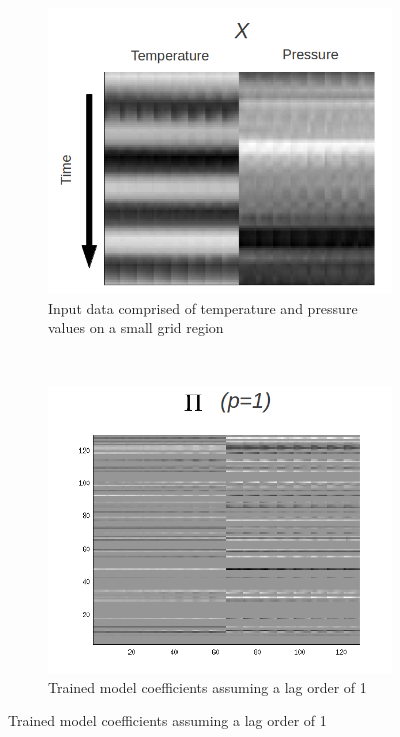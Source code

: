 \documentclass{article} %
\begin{document}
\begin{figure}
\centering
\begin{subfigure}[]{0.5\textwidth}
	\includegraphics[width=1.0\textwidth]{./var_data_example.png}
	\caption{Input data comprised of temperature and pressure values on a small grid region}
\end{subfigure}
\\
\begin{subfigure}{0.2\textwidth}
	\includegraphics[width=1.0\textwidth]{./var_params_lag_1.png}
	\caption{Trained model coefficients assuming a lag order of 1}

\end{subfigure}
\end{figure}
\end{document}

